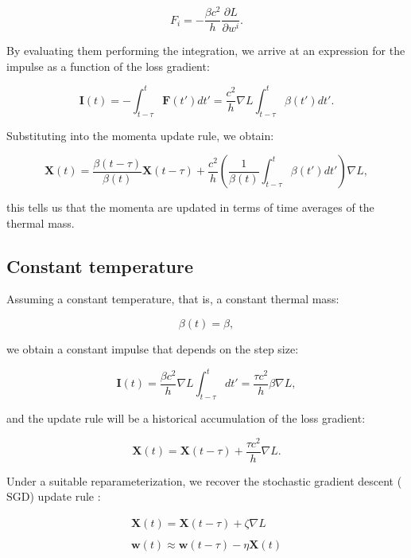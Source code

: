 \documentclass[12pt]{article}
\begin{document}
\begin{equation}
F_{i} = -\frac{\beta c^2}{h} \frac{\partial L}{\partial w^{i}}.
\end{equation}

By evaluating them performing the integration, we arrive at an expression for the impulse as a function of the loss gradient:

\begin{equation}
\mathbf{I}(t) = -\int_{t-\tau}^t\mathbf{F}(t') dt' = \frac{c^2}{h} \nabla L \int_{t-\tau}^t \beta(t')dt'.
\end{equation}

Substituting into the momenta update rule, we obtain:

\begin{equation}
\mathbf{X}(t) = \frac{\beta(t-\tau)}{\beta(t)}    \mathbf{X}(t-\tau) + \frac{c^2}{h} \left( \frac{1}{\beta(t)} \int_{t-\tau}^t \beta(t') dt'\right ) \nabla L,
\end{equation}

this tells us that the momenta are updated in terms of time averages of the thermal mass.

\subsection*{Constant temperature}

Assuming a constant temperature, that is, a constant thermal mass:

\begin{equation}
\beta(t) = \beta,
\end{equation}

we obtain a constant impulse that depends on the step size:

\begin{equation}
\mathbf{I}(t) = \frac{\beta c^2}{h} \nabla L \int_{t-\tau}^t dt' =  \frac{\tau c^2}{h}\beta \nabla L,
\end{equation}

and the update rule will be a historical accumulation of the loss gradient:

\begin{equation}
\mathbf{X}(t) = \mathbf{X}(t-\tau) + \frac{\tau c^2}{h} \nabla L.
\end{equation}

Under a suitable reparameterization, we recover the stochastic gradient descent ($\text{SGD}$) update rule \cite{bishop_dl}:

\begin{equation}
\begin{aligned}
\mathbf{X}(t) = \mathbf{X}(t-\tau) +  \zeta \nabla L
\\
\\
\mathbf{w}(t) \approx \mathbf{w}(t-\tau) - \eta \mathbf{X}(t)
\end{aligned}
\end{equation}
\end{document}

